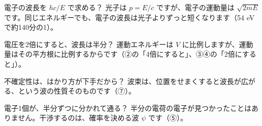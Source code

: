 \begin{tsumazuki}{電子の波長を $hc/E$ で求める？}
光子は $p=E/c$ ですが、電子の運動量は $\sqrt{2mE}$ です。同じエネルギーでも、電子の波長は光子よりずっと短くなります（54 eV で約140分の1）。
\end{tsumazuki}

\begin{tsumazuki}{電圧を2倍にすると、波長は半分？}
運動エネルギーは $V$ に比例しますが、運動量はその平方根に比例するからです（②の「4倍にすると」、③④の「2倍にすると」）。
\end{tsumazuki}

\begin{tsumazuki}{不確定性は、はかり方が下手だから？}
波束は、位置をせまくすると波長が広がる、という波の性質そのものです（⑦）。
\end{tsumazuki}

\begin{tsumazuki}{電子1個が、半分ずつに分かれて通る？}
半分の電荷の電子が見つかったことはありません。干渉するのは、確率を決める波 $\psi$ です（⑤）。
\end{tsumazuki}


